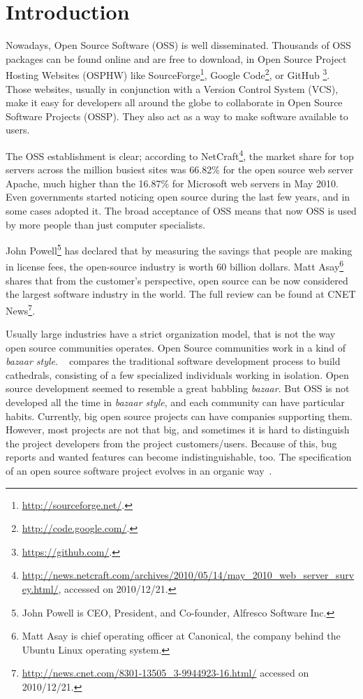 \thispagestyle{empty}
\chapter{Introduction}\label{chap:introduction}


Nowadays, Open Source Software (OSS) is well disseminated.
Thousands of OSS packages can be found online and are free to download,
in Open Source Project Hosting Websites (OSPHW) like
\textsf{SourceForge}\footnote{\url{http://sourceforge.net/}.},
\textsf{Google Code}\footnote{\url{http://code.google.com/}.}, or
\textsf{GitHub     }\footnote{\url{https://github.com/}.}.
Those websites, usually in conjunction with a Version Control System (VCS), make it easy for developers all around the globe
to collaborate in Open Source Software Projects (OSSP). They also act as a way to make software available to users.

The OSS establishment is clear;
according to \textsf{NetCraft}\footnote{\url{http://news.netcraft.com/archives/2010/05/14/may\_2010\_web\_server\_survey.html/}, accessed on 2010/12/21.},
the market share for top servers across the million busiest sites was 66.82\% for the open source web server Apache,
much higher than the 16.87\% for Microsoft web servers in May 2010.
Even governments started noticing open source during the last few years, and in some cases adopted it\cite{hahn2002government}.
The broad acceptance of OSS means that now OSS is used by more people than just computer specialists.

\textsf{John Powell}\footnote{John Powell is CEO, President, and Co-founder, Alfresco Software Inc.}
has declared that by measuring the savings that people are making in license fees, the open-source industry is worth 60 billion dollars.
\textsf{Matt Asay}\footnote{Matt Asay is chief operating officer at Canonical, the company behind the Ubuntu Linux operating system.}
shares that from the customer's perspective, open source can be now considered the largest software industry in the world.
The full review can be found at \textsf{CNET News}\footnote{\url{http://news.cnet.com/8301-13505\_3-9944923-16.html/} accessed on 2010/12/21.}.

Usually large industries have a strict organization model, that is not the way open source communities operates.
Open Source communities work in a kind of \textit{bazaar style}.
~\cite{raymondcathedral} compares the traditional software development process to build cathedrals,
consisting of a few specialized individuals working in isolation.
Open source development seemed to resemble a great babbling \textit{bazaar}.
But OSS is not developed all the time in \textit{bazaar style}, and each community can have particular habits.
Currently, big open source projects can have companies supporting them.
However, most projects are not that big, and sometimes it is hard to distinguish the project developers from the project customers/users.
Because of this, bug reports and wanted features can become indistinguishable, too.
The specification of an open source software project evolves in an organic way~\cite{capiluppicathedral}.

